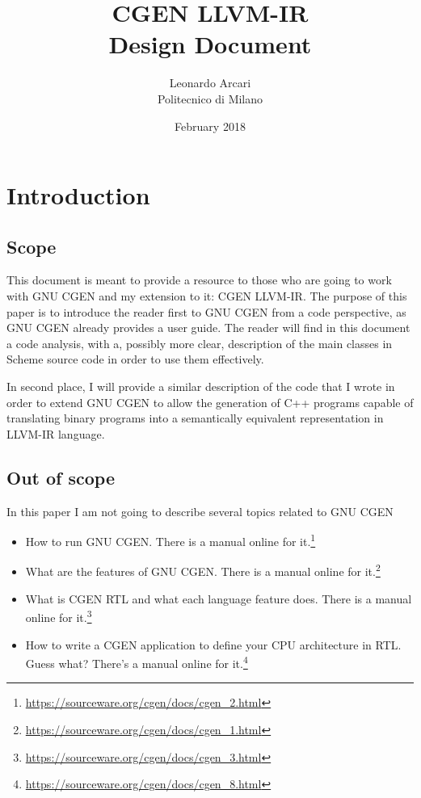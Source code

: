 \documentclass{article}
\begin{document}
\title{CGEN LLVM-IR \\ Design Document \vfill}
\author{Leonardo Arcari \\ Politecnico di Milano}
\date{February 2018}
\maketitle
\thispagestyle{empty}
\clearpage

\tableofcontents
\clearpage

\section{Introduction}
\subsection{Scope}
This document is meant to provide a resource to those who are going to work with GNU CGEN and my extension to it: CGEN LLVM-IR. The purpose of this paper is to introduce the reader first to GNU CGEN from a code perspective, as GNU CGEN already provides a user guide. The reader will find in this document a code analysis, with a, possibly more clear, description of the main classes in Scheme source code in order to use them effectively.

In second place, I will provide a similar description of the code that I wrote in order to extend GNU CGEN to allow the generation of C++ programs capable of translating binary programs into a semantically equivalent representation in LLVM-IR language.

\subsection{Out of scope}
In this paper I am not going to describe several topics related to GNU CGEN
\begin{itemize}
\item How to run GNU CGEN. There is a manual online for it.\footnote{\url{https://sourceware.org/cgen/docs/cgen_2.html}}
\item What are the features of GNU CGEN. There is a manual online for it.\footnote{\url{https://sourceware.org/cgen/docs/cgen_1.html}}
\item What is CGEN RTL and what each language feature does. There is a manual online for it.\footnote{\url{https://sourceware.org/cgen/docs/cgen_3.html}}
\item How to write a CGEN application to define your CPU architecture in RTL. Guess what? There's a manual online for it.\footnote{\url{https://sourceware.org/cgen/docs/cgen_8.html}}
\end{itemize}
\end{document}
